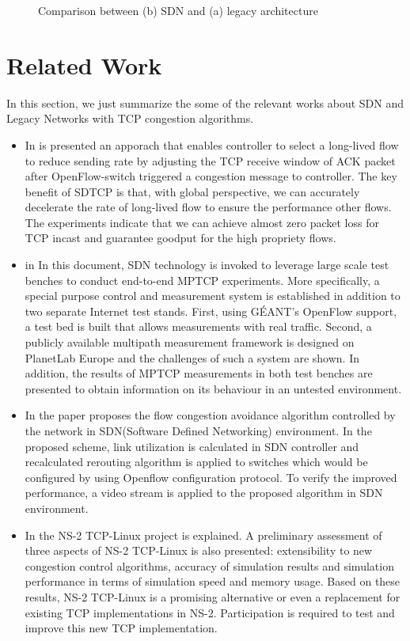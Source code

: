 {\begin{figure}[!htb]
	 \caption{Comparison between (b) SDN and (a) legacy architecture}
	\label{figure}
\end{figure}
}
\section{\normalsize Related Work}{
In this section, we just summarize the some of the relevant works about SDN and Legacy Networks with TCP congestion algorithms.
\begin{itemize}
\item In \cite{aa}  is presented an apporach that enables controller to select a long-lived flow to reduce sending rate by adjusting the TCP receive window of ACK packet after OpenFlow-switch triggered a congestion message to controller. The key benefit of SDTCP is that, with global perspective, we can accurately decelerate the rate of long-lived flow to ensure the performance other flows. The experiments indicate that we can achieve almost zero packet loss for TCP incast and guarantee goodput for the high propriety flows.
\item in \cite{bb} In this document, SDN technology is invoked to leverage large scale test benches to conduct end-to-end MPTCP experiments. More specifically, a special purpose control and measurement system is established in addition to two separate Internet test stands. First, using GÉANT's OpenFlow support, a test bed is built that allows measurements with real traffic. Second, a publicly available multipath measurement framework is designed on PlanetLab Europe and the challenges of such a system are shown. In addition, the results of MPTCP measurements in both test benches are presented to obtain information on its behaviour in an untested environment.
\item In \cite{cc} the paper proposes the flow congestion avoidance algorithm controlled by the network in SDN(Software Defined Networking) environment. In the proposed scheme, link utilization is calculated in SDN controller and recalculated rerouting algorithm is applied to switches which would be configured by using Openflow configuration protocol. To verify the improved performance, a video stream is applied to the proposed algorithm in SDN environment.
\item In \cite {dd} the NS-2 TCP-Linux project is explained. A preliminary assessment of three aspects of NS-2 TCP-Linux is also presented: extensibility to new congestion control algorithms, accuracy of simulation results and simulation performance in terms of simulation speed and memory usage. Based on these results, NS-2 TCP-Linux is a promising alternative or even a replacement for existing TCP implementations in NS-2. Participation is required to test and improve this new TCP implementation.

\end{itemize}}
